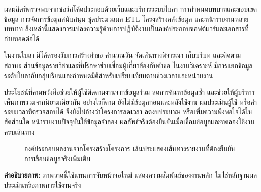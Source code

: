 ผลผลิตที่ตรวจพบจากซอร์สโค้ดประกอบด้วยเว็บและบริการระบบใบลา การกำหนดบทบาทและขอบเขตข้อมูล การจัดการข้อมูลสนับสนุน ชุดประมวลผล ETL โครงสร้างคลังข้อมูล และหน้ารายงานหลายบทบาท สิ่งเหล่านี้แสดงการแปลงความรู้ด้านการปฏิบัติงานเป็นองค์ประกอบซอฟต์แวร์และเอกสารที่ถ่ายทอดต่อได้

ในงานใบลา มีโค้ดรองรับการสร้างคำขอ คำนวณวัน จัดเส้นทางพิจารณา เก็บบริบท และติดตามสถานะ ส่วนข้อมูลรายวิชาและที่ปรึกษาช่วยเชื่อมผู้เกี่ยวข้องกับคำขอ ในงานวิเคราะห์ มีการแยกข้อมูลระดับใบลากับกลุ่มเรียนและกำหนดมิติสำหรับเปรียบเทียบตามช่วงเวลาและหน่วยงาน

ประโยชน์ที่คาดหวังคือช่วยให้ผู้ใช้ติดตามงานจากข้อมูลร่วม ลดการค้นหาข้อมูลซ้ำ และช่วยให้ผู้บริหารเห็นภาพรวมจากนิยามเดียวกัน อย่างไรก็ตาม ยังไม่มีข้อมูลก่อนและหลังใช้งาน ผลประเมินผู้ใช้ หรือค่าระยะเวลาที่ตรวจสอบได้ จึงยังไม่อ้างว่าโครงการลดเวลา ลดงบประมาณ หรือเพิ่มความพึงพอใจได้ในสัดส่วนใด หน้ารายงานปัจจุบันใช้ข้อมูลจำลอง ผลลัพธ์จริงต้องยืนยันเมื่อเชื่อมข้อมูลและทดลองใช้งานครบเส้นทาง

\begin{figure}[H]
  \centering
  \caption{องค์ประกอบผลงานจากโครงสร้างโครงการ เส้นประแสดงเส้นทางรายงานที่ต้องยืนยันการเชื่อมข้อมูลจริงเพิ่มเติม}
\end{figure}

\noindent\textbf{คำอธิบายภาพ:} ภาพวาดนี้ใช้แทนการจับหน้าจอใหม่ แสดงความสัมพันธ์ของงานหลัก ไม่ใช่หลักฐานผลประเมินหรือภาพการใช้งานจริง
